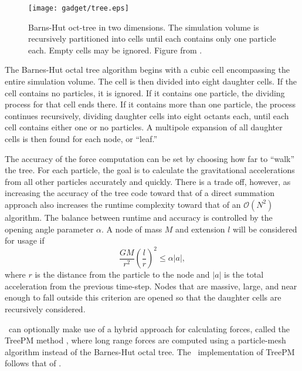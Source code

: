 \begin{figure}[t]
	\centering
	\texttt{[image: gadget/tree.eps]}
	\caption[Barns-Hut oct-tree in two dimensions.]{\footnotesize Barns-Hut oct-tree in two dimensions.  The simulation volume is recursively partitioned into cells until each contains only one particle each.  Empty cells may be ignored.  Figure from \citet{2001NewA....6...79S}.}
	\label{fig:gadget--gadget--tree}
\end{figure}

The Barnes-Hut octal tree algorithm begins with a cubic cell encompassing the entire simulation volume.  The cell is then divided into eight daughter cells.  If the cell contains no particles, it is ignored.  If it contains one particle, the dividing process for that cell ends there.  If it contains more than one particle, the process continues recursively, dividing daughter cells into eight octants each, until each cell contains either one or no particles.  A multipole expansion of all daughter cells is then found for each node, or ``leaf.''

The accuracy of the force computation can be set by choosing how far to ``walk'' the tree.  For each particle, the goal is to calculate the gravitational accelerations from all other particles accurately and quickly.  There is a trade off, however, as increasing the accuracy of the tree code toward that of a direct summation approach also increases the runtime complexity toward that of an $\mathcal{O}(N^{2})$ algorithm.  The balance between runtime and accuracy is controlled by the opening angle parameter $\alpha$.  A node of mass $M$ and extension $l$ will be considered for usage if
\begin{equation}
	\frac{GM}{r^{2}} \left( \frac{l}{r} \right)^{2} \leq \alpha |a|,
\end{equation}
where $r$ is the distance from the particle to the node and $|a|$ is the total acceleration from the previous time-step.  Nodes that are massive, large, and near enough to fall outside this criterion are opened so that the daughter cells are recursively considered.

\gadgettwo\ can optionally make use of a hybrid approach for calculating forces, called the TreePM method \citep{1995ApJS...98..355X, 2000ApJS..128..561B, 2002JApA...23..185B}, where long range forces are computed using a particle-mesh algorithm instead of the Barnes-Hut octal tree.  The \gadgettwo\ implementation of TreePM follows that of \citet{2003NewA....8..665B}.



